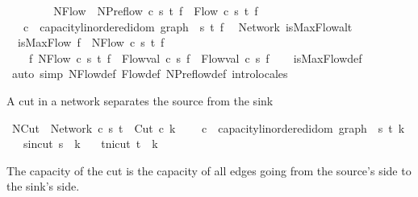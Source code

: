 \begin{isabellebody}
\isanewline
\ \ \isanewline
{}\isamarkupfalse%
\isanewline
\ \ \ \ \isanewline
{}\isamarkupfalse%
\ NFlow\ {\isacharequal}\ NPreflow\ c\ s\ t\ f\ {\isacharplus}\ Flow\ c\ s\ t\ f\ \isanewline
\ \ \ c\ {\isacharcolon}{\isacharcolon}\ {\isachardoublequoteopen}{\isacharprime}capacity{\isacharcolon}{\isacharcolon}linordered{\isacharunderscore}idom\ graph{\isachardoublequoteclose}\ \ s\ t\ f\isanewline
\isanewline
{}\isamarkupfalse%
\ {\isacharparenleft}\ Network{\isacharparenright}\ isMaxFlow{\isacharunderscore}alt{\isacharcolon}\ \isanewline
\ \ {\isachardoublequoteopen}isMaxFlow\ f\ {\isasymlongleftrightarrow}\ NFlow\ c\ s\ t\ f\ {\isasymand}\ \isanewline
\ \ \ \ {\isacharparenleft}{\isasymforall}f{\isacharprime}{\isachardot}\ NFlow\ c\ s\ t\ f{\isacharprime}\ {\isasymlongrightarrow}\ Flow{\isachardot}val\ c\ s\ f{\isacharprime}\ {\isasymle}\ Flow{\isachardot}val\ c\ s\ f{\isacharparenright}{\isachardoublequoteclose}\isanewline
%
\isadelimproof
\ \ %
\endisadelimproof
%
\isatagproof
{}\isamarkupfalse%
\ isMaxFlow{\isacharunderscore}def\ \ \ \ \ \isanewline
\ \ \isamarkupfalse%
\ {\isacharparenleft}auto\ simp{\isacharcolon}\ NFlow{\isacharunderscore}def\ Flow{\isacharunderscore}def\ NPreflow{\isacharunderscore}def{\isacharparenright}\ intro{\isacharunderscore}locales%
\endisatagproof
{\isafoldproof}%
%
\isadelimproof
%
\endisadelimproof
%
\begin{isamarkuptext}%
A cut in a network separates the source from the sink%
\end{isamarkuptext}\isamarkuptrue%
\isamarkupfalse%
\ NCut\ {\isacharequal}\ Network\ c\ s\ t\ {\isacharplus}\ Cut\ c\ k\ \isanewline
\ \ \ c\ {\isacharcolon}{\isacharcolon}\ {\isachardoublequoteopen}{\isacharprime}capacity{\isacharcolon}{\isacharcolon}linordered{\isacharunderscore}idom\ graph{\isachardoublequoteclose}\ \ s\ t\ k\ {\isacharplus}\isanewline
\ \ \ s{\isacharunderscore}in{\isacharunderscore}cut{\isacharcolon}\ {\isachardoublequoteopen}s\ {\isasymin}\ k{\isachardoublequoteclose}\isanewline
\ \ \ t{\isacharunderscore}ni{\isacharunderscore}cut{\isacharcolon}\ {\isachardoublequoteopen}t\ {\isasymnotin}\ k{\isachardoublequoteclose}\isanewline
{}%
\begin{isamarkuptext}%
The capacity of the cut is the capacity of all edges going from the 
    source's side to the sink's side.%

\end{isamarkuptext}
\end{isabellebody}
